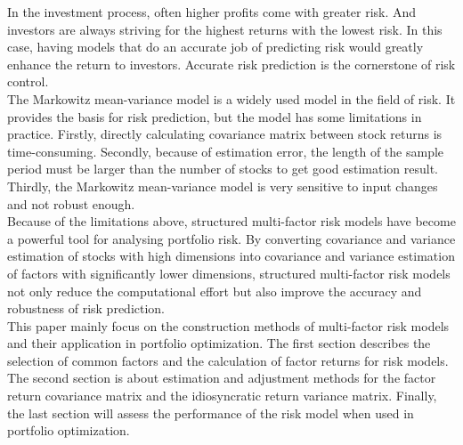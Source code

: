 \documentclass[10pt]{article}
\begin{document}
In the investment process, often higher profits come with greater risk. And investors are always striving for the highest returns with the lowest risk. In this case, having models that do an accurate job of predicting risk would greatly enhance the return to investors. Accurate risk prediction is the cornerstone of risk control.\\
The Markowitz mean-variance model is a widely used model in the field of risk. It provides the basis for risk prediction, but the model has some limitations in practice. Firstly, directly calculating covariance matrix between stock returns is time-consuming. Secondly, because of estimation error, the length of the sample period must be larger than the number of stocks to get good estimation result. Thirdly, the Markowitz mean-variance model is very sensitive to input changes and not robust enough.\\
Because of the limitations above, structured multi-factor risk models have become a powerful tool for analysing portfolio risk. By converting covariance and variance estimation of stocks with high dimensions into covariance and variance estimation of factors with significantly lower dimensions, structured multi-factor risk models not only reduce the computational effort but also improve the accuracy and robustness of risk prediction.\\
This paper mainly focus on the construction methods of multi-factor risk models and their application in portfolio optimization. The first section describes the selection of common factors and the calculation of factor returns for risk models. The second section is about estimation and adjustment methods for the factor return covariance matrix and the idiosyncratic return variance matrix. Finally, the last section will assess the performance of the risk model when used in portfolio optimization.
\end{document}
